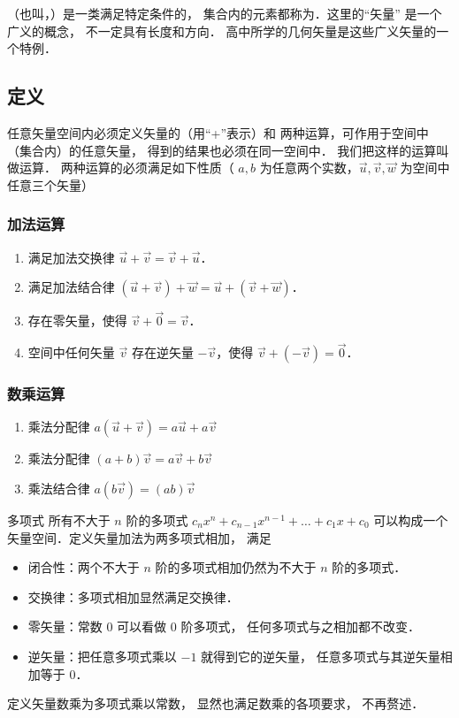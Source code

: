 

（也叫，）是一类满足特定条件的， 集合内的元素都称为．这里的“矢量” 是一个广义的概念， 不一定具有长度和方向． 高中所学的几何矢量是这些广义矢量的一个特例．

\subsection{定义}
任意矢量空间内必须定义矢量的（用“+”表示）和 两种运算，可作用于空间中（集合内）的任意矢量， 得到的结果也必须在同一空间中． 我们把这样的运算叫做运算． 两种运算的必须满足如下性质（ $a,b$ 为任意两个实数，$\vec u,\vec v,\vec w$ 为空间中任意三个矢量）

\subsubsection{加法运算}
\begin{enumerate}
\item 满足加法交换律 $\vec u + \vec v = \vec v + \vec u$．
\item 满足加法结合律 $(\vec u + \vec v) + \vec w = \vec u + (\vec v + \vec w)$．
\item 存在零矢量，使得 $\vec v + \vec 0 = \vec v$．
\item 空间中任何矢量 $\vec v$ 存在逆矢量 $-\vec v$，使得 $\vec v + (-\vec v) = \vec 0$．
\end{enumerate}

\subsubsection{数乘运算}
\begin{enumerate}
\item 乘法分配律 $a(\vec u + \vec v) = a\vec u + a\vec v$ 
\item 乘法分配律 $(a + b)\vec v = a\vec v + b\vec v$
\item 乘法结合律 $a (b \vec v) = (ab) \vec v$
\end{enumerate}

\begin{exam}{多项式}\label{LSpace_ex1}
所有不大于 $n$ 阶的多项式 $c_n x^n + c_{n-1} x^{n-1} + \dots + c_1 x + c_0$ 可以构成一个矢量空间．定义矢量加法为两多项式相加， 满足
\begin{itemize}
\item 闭合性：两个不大于 $n$ 阶的多项式相加仍然为不大于 $n$ 阶的多项式．
\item 交换律：多项式相加显然满足交换律．
\item 零矢量：常数 0 可以看做 0 阶多项式， 任何多项式与之相加都不改变．
\item 逆矢量：把任意多项式乘以 $-1$ 就得到它的逆矢量， 任意多项式与其逆矢量相加等于 0．
\end{itemize}
定义矢量数乘为多项式乘以常数， 显然也满足数乘的各项要求， 不再赘述．
\end{exam}

